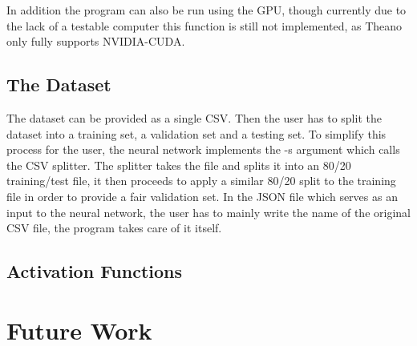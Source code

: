 \documentclass{article}
\begin{document}
In addition the program can also be run using the GPU, though currently due to the lack of a testable computer this function is still not implemented, as Theano only fully supports NVIDIA-CUDA\@.

\subsection{The Dataset}
The dataset can be provided as a single CSV\@. Then the user has to split the dataset into a training set, a validation set and a testing set. To simplify this process for the user, the neural network implements the -s argument which calls the CSV splitter. The splitter takes the file and splits it into an 80/20 training/test file, it then proceeds to apply a similar 80/20 split to the training file in order to provide a fair validation set. In the JSON file which serves as an input to the neural network, the user has to mainly write the name of the original CSV file, the program takes care of it itself.
\subsection{Activation Functions}
\section{Future Work}
\label{sec:future_work}
\end{document}

